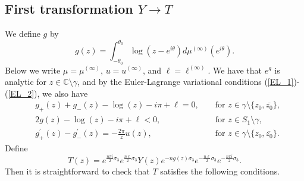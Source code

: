 \documentclass[11pt,fleqn]{article}
\numberwithin{equation}{section}
\begin{document}
\subsection{First transformation $Y \to T$}
We define $g$ by
\begin{equation}\label{g}
g(z)=\int_{-\theta_{0}}^{\theta_{0}}\log(z-e^{i\theta})d\mu^{(\infty)}(e^{i\theta}).
\end{equation}
Below we write $\mu=\mu^{(\infty)}$, $u=u^{(\infty)}$, and $\ell=\ell^{(\infty)}$.
We have that $e^g$ is analytic for $z\in\mathbb C\setminus\gamma$, and by the Euler-Lagrange variational conditions (\ref{EL_1})-(\ref{EL_2}), we also have 
\begin{align}
&\label{g1}g_{+}(z) + g_{-}(z) - \log(z) -i\pi + \ell = 0 ,&&\mbox{ for } z\in \gamma\setminus\{z_{0},\overline{z_{0}}\},\\
&\label{g2}2g(z)  - \log(z) -i\pi+\ell<0,&&\mbox{ for }z\in S_{1}\setminus \gamma,\\
&\label{g3}g_{+}^{\prime}(z) - g_{-}^{\prime}(z)=-\frac{2\pi}{z}u(z),&&\mbox{ for }z\in \gamma\setminus\{z_{0},\overline{z_{0}}\}.
\end{align}
Define
\begin{equation}\label{def T}
T(z) = e^{\frac{n\pi i}{2}\sigma_{3}} e^{\frac{n\ell}{2}\sigma_{3}} Y(z) e^{-ng(z)\sigma_{3}} e^{-\frac{n\ell}{2}\sigma_{3}}e^{-\frac{n\pi i}{2}\sigma_{3}}.
\end{equation}
Then it is straightforward to check that $T$ satisfies the following conditions.
\end{document}
